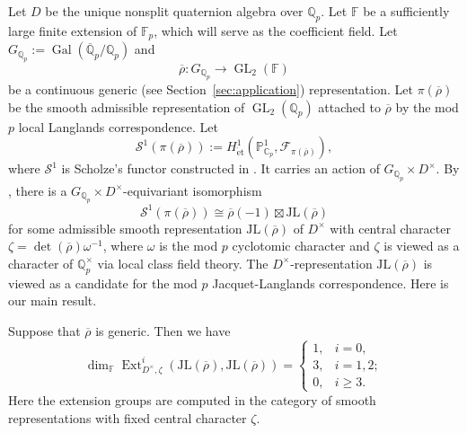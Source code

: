 \documentclass[11pt,a4paper]{article} %
\def\CC{\mathbb{C}}
\def\FF{\mathbb{F}}
\def\PP{\mathbb{P}}
\def\cF{\mathcal{F}}
\def\cS{\mathcal{S}}
\def\det{\operatorname{det}}
\def\dim{\operatorname{dim}}
\def\Ext{\operatorname{Ext}} %
\def\Gal{\operatorname{Gal}}
\def\GL{\operatorname{GL}}
\def\Fp{\mathbb{F}_p}
\def\Qp{\mathbb{Q}_p}
\def\Qpbar{\overline{\mathbb{Q}}_p}
\def\rhobar{\overline{\rho}}
\begin{document}
Let $D$ be the unique nonsplit quaternion algebra over $\Qp$. Let $\FF$ be a sufficiently large finite extension of $\Fp$, which will serve as the coefficient field. Let $G_{\Qp}:=\Gal(\Qpbar/\Qp)$ and
\[
\rhobar:G_{\Qp}\longrightarrow\GL_2(\FF)
\]
be a continuous generic (see Section~\ref{sec:application}) representation. Let $\pi(\rhobar)$ be the smooth admissible representation of $\GL_2(\Qp)$ attached to $\rhobar$ by the mod $p$ local Langlands correspondence. Let
\[
\cS^1(\pi(\rhobar))
:=H^1_{\mathrm{\acute et}}\left(\PP^1_{\CC_p},
\cF_{\pi(\rhobar)}\right),
\]
where $\cS^1$ is Scholze's functor constructed in \cite{Sch18}. It carries an action of $G_{\Qp}\times D^{\times}$. By \cite[Theorem 1.4]{HW24a}, there is a $G_{\Qp}\times D^\times$-equivariant isomorphism
\[
\cS^1(\pi(\rhobar))\cong\rhobar(-1)\boxtimes\mathrm{JL}(\rhobar)
\]
for some admissible smooth representation $\mathrm{JL}(\rhobar)$ of $D^\times$ with central character $\zeta=\det(\rhobar)\omega^{-1}$, where $\omega$ is the mod $p$ cyclotomic character and $\zeta$ is viewed as a character of $\Qp^\times$ via local class field theory. The $D^\times$-representation $\mathrm{JL}(\rhobar)$ is viewed as a candidate for the mod $p$ Jacquet-Langlands correspondence. Here is our main result.

\begin{theorem}\label{thm:main}
    Suppose that $\rhobar$ is generic. Then we have
    \[
    \dim_\FF\Ext^i_{D^\times,\zeta}
    \left(\mathrm{JL}(\rhobar),\mathrm{JL}(\rhobar)\right)
    =
    \begin{cases}
    1,&i=0,\\
    3,&i=1,2;\\
    0,&i\ge3.
    \end{cases}
    \]
    Here the extension groups are computed in the category of smooth representations with fixed central character $\zeta$.
\end{theorem}
\end{document}
